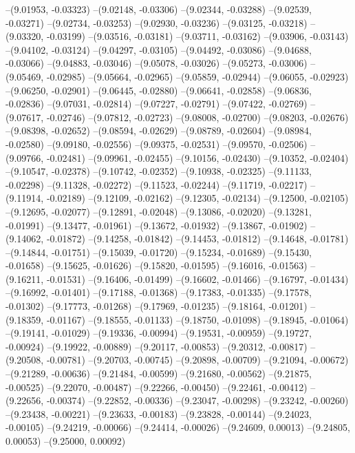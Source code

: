 --(9.01953, -0.03323)
--(9.02148, -0.03306)
--(9.02344, -0.03288)
--(9.02539, -0.03271)
--(9.02734, -0.03253)
--(9.02930, -0.03236)
--(9.03125, -0.03218)
--(9.03320, -0.03199)
--(9.03516, -0.03181)
--(9.03711, -0.03162)
--(9.03906, -0.03143)
--(9.04102, -0.03124)
--(9.04297, -0.03105)
--(9.04492, -0.03086)
--(9.04688, -0.03066)
--(9.04883, -0.03046)
--(9.05078, -0.03026)
--(9.05273, -0.03006)
--(9.05469, -0.02985)
--(9.05664, -0.02965)
--(9.05859, -0.02944)
--(9.06055, -0.02923)
--(9.06250, -0.02901)
--(9.06445, -0.02880)
--(9.06641, -0.02858)
--(9.06836, -0.02836)
--(9.07031, -0.02814)
--(9.07227, -0.02791)
--(9.07422, -0.02769)
--(9.07617, -0.02746)
--(9.07812, -0.02723)
--(9.08008, -0.02700)
--(9.08203, -0.02676)
--(9.08398, -0.02652)
--(9.08594, -0.02629)
--(9.08789, -0.02604)
--(9.08984, -0.02580)
--(9.09180, -0.02556)
--(9.09375, -0.02531)
--(9.09570, -0.02506)
--(9.09766, -0.02481)
--(9.09961, -0.02455)
--(9.10156, -0.02430)
--(9.10352, -0.02404)
--(9.10547, -0.02378)
--(9.10742, -0.02352)
--(9.10938, -0.02325)
--(9.11133, -0.02298)
--(9.11328, -0.02272)
--(9.11523, -0.02244)
--(9.11719, -0.02217)
--(9.11914, -0.02189)
--(9.12109, -0.02162)
--(9.12305, -0.02134)
--(9.12500, -0.02105)
--(9.12695, -0.02077)
--(9.12891, -0.02048)
--(9.13086, -0.02020)
--(9.13281, -0.01991)
--(9.13477, -0.01961)
--(9.13672, -0.01932)
--(9.13867, -0.01902)
--(9.14062, -0.01872)
--(9.14258, -0.01842)
--(9.14453, -0.01812)
--(9.14648, -0.01781)
--(9.14844, -0.01751)
--(9.15039, -0.01720)
--(9.15234, -0.01689)
--(9.15430, -0.01658)
--(9.15625, -0.01626)
--(9.15820, -0.01595)
--(9.16016, -0.01563)
--(9.16211, -0.01531)
--(9.16406, -0.01499)
--(9.16602, -0.01466)
--(9.16797, -0.01434)
--(9.16992, -0.01401)
--(9.17188, -0.01368)
--(9.17383, -0.01335)
--(9.17578, -0.01302)
--(9.17773, -0.01268)
--(9.17969, -0.01235)
--(9.18164, -0.01201)
--(9.18359, -0.01167)
--(9.18555, -0.01133)
--(9.18750, -0.01098)
--(9.18945, -0.01064)
--(9.19141, -0.01029)
--(9.19336, -0.00994)
--(9.19531, -0.00959)
--(9.19727, -0.00924)
--(9.19922, -0.00889)
--(9.20117, -0.00853)
--(9.20312, -0.00817)
--(9.20508, -0.00781)
--(9.20703, -0.00745)
--(9.20898, -0.00709)
--(9.21094, -0.00672)
--(9.21289, -0.00636)
--(9.21484, -0.00599)
--(9.21680, -0.00562)
--(9.21875, -0.00525)
--(9.22070, -0.00487)
--(9.22266, -0.00450)
--(9.22461, -0.00412)
--(9.22656, -0.00374)
--(9.22852, -0.00336)
--(9.23047, -0.00298)
--(9.23242, -0.00260)
--(9.23438, -0.00221)
--(9.23633, -0.00183)
--(9.23828, -0.00144)
--(9.24023, -0.00105)
--(9.24219, -0.00066)
--(9.24414, -0.00026)
--(9.24609, 0.00013)
--(9.24805, 0.00053)
--(9.25000, 0.00092)
